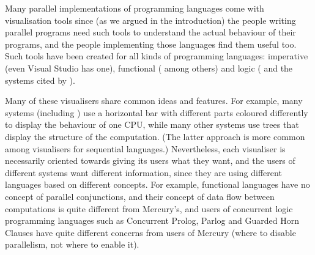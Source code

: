% 
% 
% 
% 


Many parallel implementations of programming languages
come with visualisation tools
since (as we argued in the introduction)
the people writing parallel programs
need such tools to understand the actual behaviour of their programs,
and the people implementing those languages find them useful too.
Such tools have been created for all kinds of programming languages:
imperative (even Visual Studio has one),
functional
(\citet{edentraceviewer,loidl98:gransim,runciman93:profilingparfp} among others)
and logic (\citet{Foster96,vace}
and the systems cited by \citet{Gupta95parallelexecution}).

Many of these visualisers share common ideas and features.
For example, many systems (including \tscope)
use a horizontal bar with different parts coloured differently
to display the behaviour of one CPU,
while many other systems use trees
that display the structure of the computation.
(The latter approach is more common
among visualisers for sequential languages.)
Nevertheless, each visualiser is necessarily oriented
towards giving its users what they want,
and the users of different systems want different information,
since they are using different languages based on different concepts.
For example, functional languages have no concept of parallel conjunctions,
and their concept of data flow between computations
is quite different from Mercury's,
and users of concurrent logic programming languages
such as Concurrent Prolog, Parlog and Guarded Horn Clauses
have quite different concerns from users of Mercury
(where to disable parallelism, not where to enable it).

